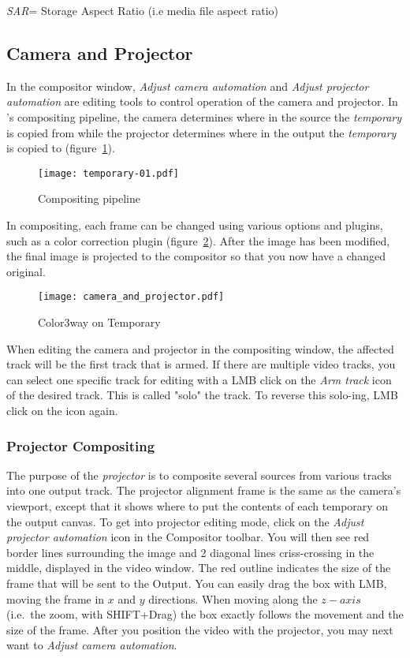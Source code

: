\textit{SAR}= Storage Aspect Ratio (i.e media file aspect ratio)


\subsection{Camera and Projector}%
\label{sub:camera_and_projector}

In the compositor window, \textit{Adjust camera automation} and \textit{Adjust projector automation}
are editing tools to control operation of the camera and projector.  In \CGG{}'s compositing
pipeline, the camera determines where in the source the \textit{temporary} is copied from while
the projector determines where in the output the \textit{temporary} is copied to
(figure~\ref{fig:temporary-01}). 

\begin{figure}[htpb]
    \centering
    \texttt{[image: temporary-01.pdf]}
    \caption{Compositing pipeline}
    \label{fig:temporary-01}
\end{figure}

In compositing, each frame can be changed using various options and plugins, such as
a color correction plugin (figure~\ref{fig:camera_and_projector}).  After the image has been
modified, the final image is projected to the compositor so that you now have a changed original.

\begin{figure}[htpb]
    \centering
    \texttt{[image: camera\_and\_projector.pdf]}
    \caption{Color3way on Temporary}
    \label{fig:camera_and_projector}
\end{figure}

When editing the camera and projector in the compositing window, the affected track will be the
first track that is armed.  If there are multiple video tracks, you can select one specific track
for editing with a LMB click on the \textit{Arm track} icon of the desired track. This is called
"solo" the track. To reverse this solo-ing, LMB click on the icon again. 

\subsubsection*{Projector Compositing}%
\label{ssub:projector_compositing}

The purpose of the \textit{projector} is to composite several sources from various tracks into one
output track.  The projector alignment frame is the same as the camera's viewport, except that it
shows where to put the contents of each temporary on the output canvas.  To get into projector
editing mode, click on the \textit{Adjust projector automation} icon in the Compositor toolbar. You
will then see red border lines surrounding the image and 2 diagonal lines criss-crossing in the 
middle, displayed in the video window.  The red outline indicates the size of the frame that will be
sent to the Output. You can easily drag the box with LMB, moving the frame in $x$ and $y$ directions.
When moving along the $z-axis$ (i.e.\ the zoom, with SHIFT+Drag) the box exactly follows the movement
and the size of the frame. After you position the video with the projector, you may next want to
\textit{Adjust camera automation}.

